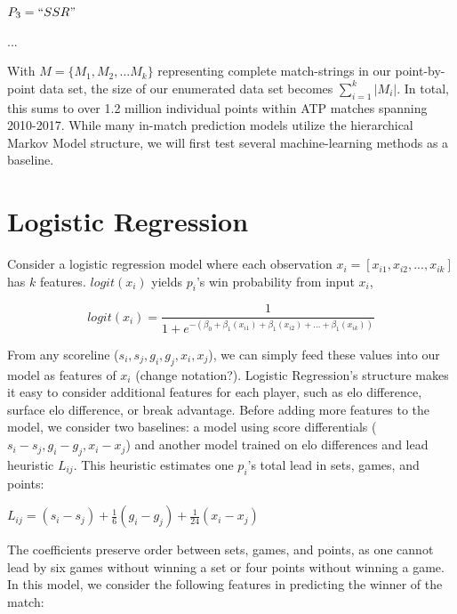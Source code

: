 \documentclass[chapterprefix=false]{report}
\begin{document}
$P_3 = ``SSR"$

...

With $M = \{M_1,M_2,...M_k\}$ representing complete match-strings in our point-by-point data set, the size of our enumerated data set becomes $\sum_{i=1}^k |M_i|$. In total, this sums to over 1.2 million individual points within ATP matches spanning 2010-2017. While many in-match prediction models utilize the hierarchical Markov Model structure, we will first test several machine-learning methods as a baseline.


\section{Logistic Regression}

Consider a logistic regression model where each observation $x_i = [x_{i1},x_{i2},...,x_{ik}]$ has $k$ features. $logit(x_i)$ yields $p_i$'s win probability from input $x_i$,

$$logit(x_i) = \frac{1}{1+e^{-(\beta_0+\beta_1(x_{i1})+\beta_1(x_{i2})+...+\beta_1(x_{ik}))}}$$

From any scoreline ($s_i,s_j,g_i,g_j,{x}_i,{x}_j$), we can simply feed these values into our model as features of $x_i$ (change notation?). Logistic Regression's structure makes it easy to consider additional features for each player, such as elo difference, surface elo difference, or break advantage. Before adding more features to the model, we consider two baselines: a model using score differentials ($s_i-s_j,g_i-g_j,{x}_i-{x}_j$) and another model trained on elo differences and lead heuristic $L_{ij}$. This heuristic estimates one $p_i$'s total lead in sets, games, and points:

\begin{center}
$L_{ij} = (s_i-s_j) + \frac{1}{6}(g_i-g_j) + \frac{1}{24}(x_i-x_j)$
\end{center}

The coefficients preserve order between sets, games, and points, as one cannot lead by six games without winning a set or four points without winning a game. In this model, we consider the following features in predicting the winner of the match:
\end{document}
